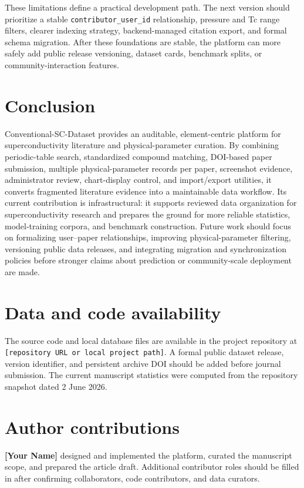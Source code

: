 \documentclass[11pt,a4paper]{article}
\begin{document}
These limitations define a practical development path. The next version should prioritize a stable \texttt{contributor\_user\_id} relationship, pressure and Tc range filters, clearer indexing strategy, backend-managed citation export, and formal schema migration. After these foundations are stable, the platform can more safely add public release versioning, dataset cards, benchmark splits, or community-interaction features.

\section{Conclusion}

Conventional-SC-Dataset provides an auditable, element-centric platform for superconductivity literature and physical-parameter curation. By combining periodic-table search, standardized compound matching, DOI-based paper submission, multiple physical-parameter records per paper, screenshot evidence, administrator review, chart-display control, and import/export utilities, it converts fragmented literature evidence into a maintainable data workflow. Its current contribution is infrastructural: it supports reviewed data organization for superconductivity research and prepares the ground for more reliable statistics, model-training corpora, and benchmark construction. Future work should focus on formalizing user--paper relationships, improving physical-parameter filtering, versioning public data releases, and integrating migration and synchronization policies before stronger claims about prediction or community-scale deployment are made.

\section*{Data and code availability}

The source code and local database files are available in the project repository at \texttt{[repository URL or local project path]}. A formal public dataset release, version identifier, and persistent archive DOI should be added before journal submission. The current manuscript statistics were computed from the repository snapshot dated 2 June 2026.

\section*{Author contributions}

\textbf{[Your Name]} designed and implemented the platform, curated the manuscript scope, and prepared the article draft. Additional contributor roles should be filled in after confirming collaborators, code contributors, and data curators.
\end{document}
